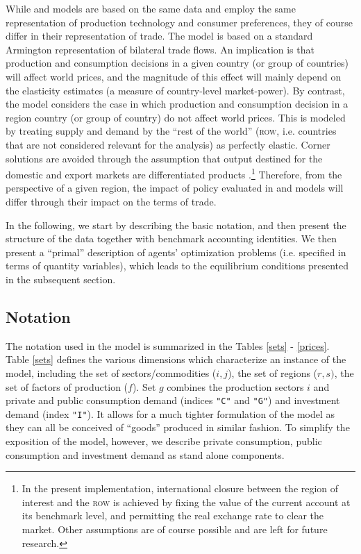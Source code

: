 While \GMR and \SOE models are based on the same data and employ the
same representation of production technology and consumer preferences,
they of course differ in their representation of trade. The \GMR model
is based on a standard Armington representation of bilateral trade
flows. An implication is that production and consumption decisions in
a given country (or group of countries) will affect world prices, and
the magnitude of this effect will mainly depend on the elasticity
estimates (a measure of country-level market-power). By contrast, the
\SOE model considers the case in which production and consumption
decision in a region country (or group of country) do not affect world
prices. This is modeled by treating supply and demand by the ``rest of
the world'' (\textsc{row}, i.e. countries that are not considered
relevant for the \SOE analysis) as perfectly elastic.  Corner
solutions are avoided through the assumption that output destined for
the domestic and export markets are differentiated products
\citep[see][]{DeMeloRobinson1989}.\footnote{In the present
implementation, international closure between the region of interest
and the \textsc{row} is achieved by fixing the value of the current
account at its benchmark level, and permitting the real exchange rate
to clear the market. Other assumptions are of course possible and are
left for future research. } Therefore, from the perspective of a given
region, the impact of policy evaluated in \GMR and \SOE models will
differ through their impact on the terms of trade.

In the following, we start by describing the basic notation, and then
present the structure of the data together with benchmark accounting
identities. We then present a ``primal'' description of agents'
optimization problems (i.e. specified in terms of quantity variables),
which leads to the equilibrium conditions presented in the subsequent
section.

\subsection{Notation}

The notation used in the model is summarized in the Tables \ref{sets}
- \ref{prices}. Table \ref{sets} defines the various dimensions which
characterize an instance of the model, including the set of
sectors/commodities ($i,j$), the set of regions ($r,s)$, the set of
factors of production ($f$). Set $g$ combines the production sectors
$i$ and private and public consumption demand (indices \texttt{"C"}
and \texttt{"G"}) and investment demand (index \texttt{"I"}). It
allows for a much tighter formulation of the model as they can all be
conceived of ``goods'' produced in similar fashion. To simplify the
exposition of the model, however, we describe private consumption,
public consumption and investment demand as stand alone components.

